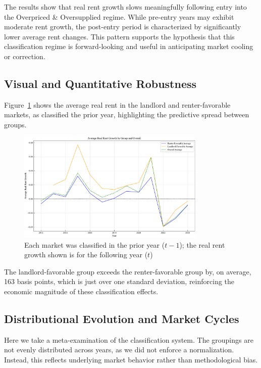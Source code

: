 \documentclass[APA,Times1COL]{WileyNJDv5} %
\begin{document}
The results show that real rent growth slows meaningfully following entry into the Overpriced \& Oversupplied regime. While pre-entry years may exhibit moderate rent growth, the post-entry period is characterized by significantly lower average rent changes. This pattern supports the hypothesis that this classification regime is forward-looking and useful in anticipating market cooling or correction.

\subsection{Visual and Quantitative Robustness}



Figure~\ref{fig:group_averages_over_time} shows the average real rent in the landlord and renter-favorable markets, as classified the prior year, highlighting the predictive spread between groups.

\begin{figure}[h]
	\centering
	\includegraphics[width=0.8\textwidth]{group_averages_over_time.pdf}
	\caption*{Each market was classified in the prior year ($t-1$); the real rent growth shown is for the following year ($t$)}
	\label{fig:group_averages_over_time}
\end{figure}


The landlord-favorable group exceeds the renter-favorable group by, on average, 163 basis points, which is just over one standard deviation, reinforcing the economic magnitude of these classification effects.

\subsection{Distributional Evolution and Market Cycles}

Here we take a meta-examination of the classification system. The groupings are not evenly distributed across years, as we did not enforce a normalization. Instead, this reflects underlying market behavior rather than methodological bias. 
\end{document}

